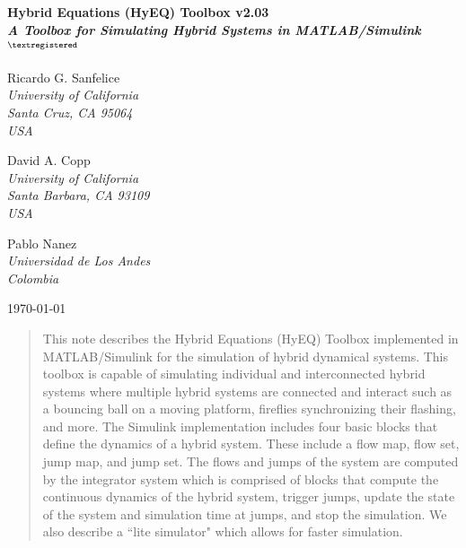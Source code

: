 \documentclass{article}
\newcounter{chapter}
\newcommand{\chapter}[1]{{\LARGE \center \bf #1 \\ \vspace{0.5in} }}
\newcommand{\HyEQversion}{\mbox{v2.03}}
\begin{document}
\chapter{Hybrid Equations (HyEQ) Toolbox \HyEQversion\\
{\it A Toolbox for Simulating Hybrid Systems in MATLAB/Simulink$^{{\footnotesize\textregistered}}$}
}
\label{app:simulations}

\vspace{-0.4in}

\begin{minipage}[t]{1.05\textwidth}
\begin{minipage}[t]{0.3\textwidth}
\begin{center}
Ricardo G. Sanfelice\\%
{\it University of California \\ Santa Cruz, CA 95064}\\
{\it USA}
\end{center}
\end{minipage}
\begin{minipage}[t]{0.3\textwidth}
\begin{center}
David A. Copp\\%
{\it University of California \\ Santa Barbara, CA 93109}\\
{\it USA}
\end{center}
\end{minipage}
\begin{minipage}[t]{0.3\textwidth}
\begin{center}
Pablo Nanez\\%
{\it Universidad de Los Andes}\\
{\it Colombia}
\end{center}
\end{minipage}
\end{minipage}

\begin{center}
{\today}
\end{center}


\begin{abstract}
This note describes the Hybrid Equations (HyEQ) Toolbox implemented in MATLAB/Simulink for the simulation of hybrid dynamical systems. This toolbox is capable of simulating individual and interconnected hybrid systems where multiple hybrid systems are connected and interact such as a bouncing ball on a moving platform, fireflies synchronizing their flashing, and more. The Simulink implementation includes four basic blocks that define the dynamics of a hybrid system. These include a flow map, flow set, jump map, and jump set. The flows and jumps of the system are computed by the integrator system which is comprised of blocks that compute the continuous dynamics of the hybrid system, trigger jumps, update the state of the system and simulation time at jumps, and stop the simulation. We also describe a ``lite simulator" which allows for faster simulation.
\end{abstract}
\end{document}

